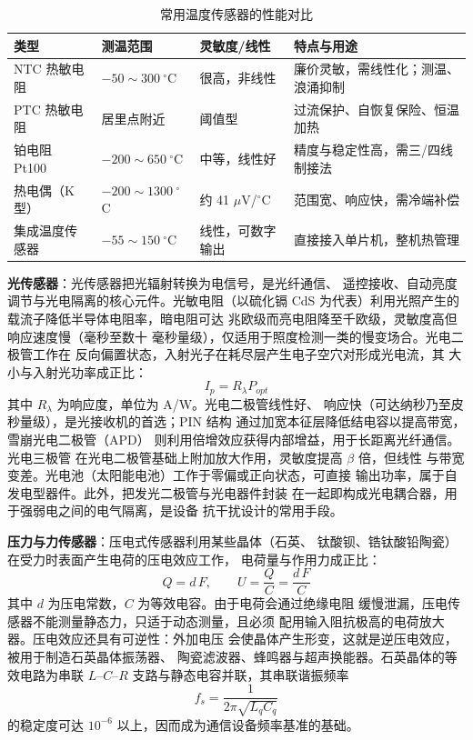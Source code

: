 \begin{table}[htbp]
\centering
\caption{常用温度传感器的性能对比}
\begin{tabular}{|p{2.2cm}|p{2.6cm}|p{2.4cm}|p{4.0cm}|}
\hline
\textbf{类型} & \textbf{测温范围} & \textbf{灵敏度/线性} & \textbf{特点与用途} \\
\hline
NTC 热敏电阻 & $-50\sim300\ ^{\circ}$C & 很高，非线性 & 廉价灵敏，需线性化；测温、浪涌抑制 \\
\hline
PTC 热敏电阻 & 居里点附近 & 阈值型 & 过流保护、自恢复保险、恒温加热 \\
\hline
铂电阻 Pt100 & $-200\sim650\ ^{\circ}$C & 中等，线性好 & 精度与稳定性高，需三/四线制接法 \\
\hline
热电偶（K 型） & $-200\sim1300\ ^{\circ}$C & 约 41 $\mu$V/$^{\circ}$C & 范围宽、响应快，需冷端补偿 \\
\hline
集成温度传感器 & $-55\sim150\ ^{\circ}$C & 线性，可数字输出 & 直接接入单片机，整机热管理 \\
\hline
\end{tabular}
\end{table}

\textbf{光传感器}：光传感器把光辐射转换为电信号，是光纤通信、
遥控接收、自动亮度调节与光电隔离的核心元件。光敏电阻（以硫化镉
CdS 为代表）利用光照产生的载流子降低半导体电阻率，暗电阻可达
兆欧级而亮电阻降至千欧级，灵敏度高但响应速度慢（毫秒至数十
毫秒量级），仅适用于照度检测一类的慢变场合。光电二极管工作在
反向偏置状态，入射光子在耗尽层产生电子空穴对形成光电流，其
大小与入射光功率成正比：
\begin{equation}
I_p = R_\lambda P_{opt}
\end{equation}
其中 $R_\lambda$ 为响应度，单位为 A/W。光电二极管线性好、
响应快（可达纳秒乃至皮秒量级），是光接收机的首选；PIN 结构
通过加宽本征层降低结电容以提高带宽，雪崩光电二极管（APD）
则利用倍增效应获得内部增益，用于长距离光纤通信。光电三极管
在光电二极管基础上附加放大作用，灵敏度提高 $\beta$ 倍，但线性
与带宽变差。光电池（太阳能电池）工作于零偏或正向状态，可直接
输出功率，属于自发电型器件。此外，把发光二极管与光电器件封装
在一起即构成光电耦合器，用于强弱电之间的电气隔离，是设备
抗干扰设计的常用手段。

\textbf{压力与力传感器}：压电式传感器利用某些晶体（石英、
钛酸钡、锆钛酸铅陶瓷）在受力时表面产生电荷的压电效应工作，
电荷量与作用力成正比：
\begin{equation}
Q = d\,F, \qquad U = \frac{Q}{C} = \frac{d\,F}{C}
\end{equation}
其中 $d$ 为压电常数，$C$ 为等效电容。由于电荷会通过绝缘电阻
缓慢泄漏，压电传感器不能测量静态力，只适于动态测量，且必须
配用输入阻抗极高的电荷放大器。压电效应还具有可逆性：外加电压
会使晶体产生形变，这就是逆压电效应，被用于制造石英晶体振荡器、
陶瓷滤波器、蜂鸣器与超声换能器。石英晶体的等效电路为串联
$L$--$C$--$R$ 支路与静态电容并联，其串联谐振频率
\[
f_s = \frac{1}{2\pi\sqrt{L_q C_q}}
\]
的稳定度可达 $10^{-6}$ 以上，因而成为通信设备频率基准的基础。

